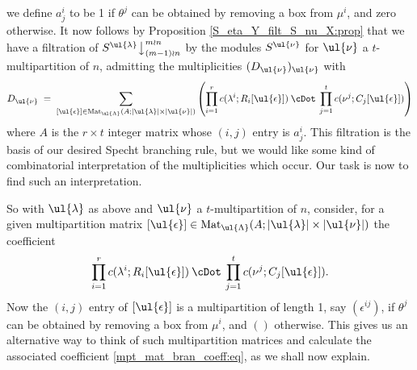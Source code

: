 we define $a^i_j$ to be 1 if $\theta^j$ can be obtained by removing a box from $\mu^i$, and zero otherwise.
It now follows by Proposition \ref{S_eta_Y_filt_S_nu_X:prop} that we have a filtration of
$S^{\ul{\lambda}}\bigr\downarrow^{m \wr n}_{(m-1) \wr n}$ by the modules $S^{\ul{\nu}}$ for $\ul{\nu}$ a $t$-multipartition of $n$, admitting the
multiplicities $(D_{\ul{\nu}})_{\ul{\nu}}$ with
\[
D_{\ul{\nu}} \; = \; \sum_{[\ul{\epsilon}] \in\mathrm{Mat}_{\ul{\Lambda}}(A;|\ul{\lambda}|\times|\ul{\nu}|)}
\left(\prod^r_{i=1}c(\lambda^i;R_i[\ul{\epsilon}])\:\cDot\:\prod^t_{j=1}c(\nu^j;C_j[\ul{\epsilon}])\right)
\]
where $A$ is the $r \times t$ integer matrix whose $(i,j)$ entry is $a^i_j$. This filtration is the basis of our desired Specht
branching rule, but we would like some kind of combinatorial interpretation of the multiplicities which occur. Our task
is now to find such an interpretation.

So with $\ul{\lambda}$ as above and $\ul{\nu}$ a $t$-multipartition of $n$, consider, for a given multipartition
matrix
$[\ul{\epsilon}] \in \mathrm{Mat}_{\ul{\Lambda}}(A;|\ul{\lambda}|\times|\ul{\nu}|)$ the coefficient
\begin{equation}\label{mpt_mat_bran_coeff:eq}
\prod^r_{i=1}c(\lambda^i;R_i[\ul{\epsilon}])\:\cDot\:\prod^t_{j=1}c(\nu^j;C_j[\ul{\epsilon}]).
\end{equation}
Now the
$(i,j)$ entry of $[\ul{\epsilon}]$ is a multipartition of length 1, say $(\epsilon^{ij})$, if $\theta^j$ can be obtained by
removing a box from $\mu^i$, and $()$ otherwise. This gives us an alternative way to think of such multipartition matrices and calculate
the associated coefficient \eqref{mpt_mat_bran_coeff:eq}, as we shall now explain.

